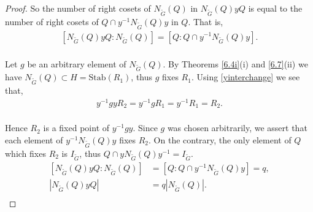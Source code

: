 \documentclass[a4paper , 11pt]{book}
\theoremstyle{definition}
\theoremstyle{remark}
\begin{document}
\begin{proof}
So the number of right cosets of $N_{\widetilde{G}}(Q)$ in $N_{\widetilde{G}}(Q) y Q$ is equal to the number of right cosets of $Q \cap y^{-1} N_{\widetilde{G}}(Q) y$ in $Q$. That is,
\vspace{2mm}
\begin{align}\label{doublecoset} [N_{\widetilde{G}}(Q) y Q : N_{\widetilde{G}}(Q)] = [Q : Q \cap y^{-1} N_{\widetilde{G}}(Q) y]. \\ \nonumber
\end{align}

Let $g$ be an arbitrary element of $N_{\widetilde{G}}(Q)$. By Theorems \ref{6.4i}(i) and \ref{6.7}(ii) we have $N_{\widetilde{G}}(Q) \subset H = \text{Stab}(R_1)$, thus $g$ fixes $R_1$. Using \eqref{yinterchange} we see that,
\vspace{2mm}
\begin{align*} y^{-1} g y R_2 = y^{-1} g R_1 = y^{-1} R_1 = R_2. \\
\end{align*}

Hence $R_2$ is a fixed point of $y^{-1} g y$. Since $g$ was chosen arbitrarily, we assert that each element of $y^{-1} N_{\widetilde{G}}(Q) y$ fixes $R_2$. On the contrary, the only element of $Q$ which fixes $R_2$ is $I_{\widetilde{G}}$, thus $Q \cap y N_{\widetilde{G}}(Q) y^{-1} = I_{\widetilde{G}}$.
\vspace{2mm}
\begin{align}\label{qwed} [N_{\widetilde{G}}(Q) y Q : N_{\widetilde{G}}(Q)] &= [Q : Q \cap y^{-1} N_{\widetilde{G}}(Q) y] = q, \nonumber
\\[1ex] |N_{\widetilde{G}}(Q) y Q| &= q|N_{\widetilde{G}}(Q)|. \\ \nonumber
\end{align}


\end{proof}
\end{document}
